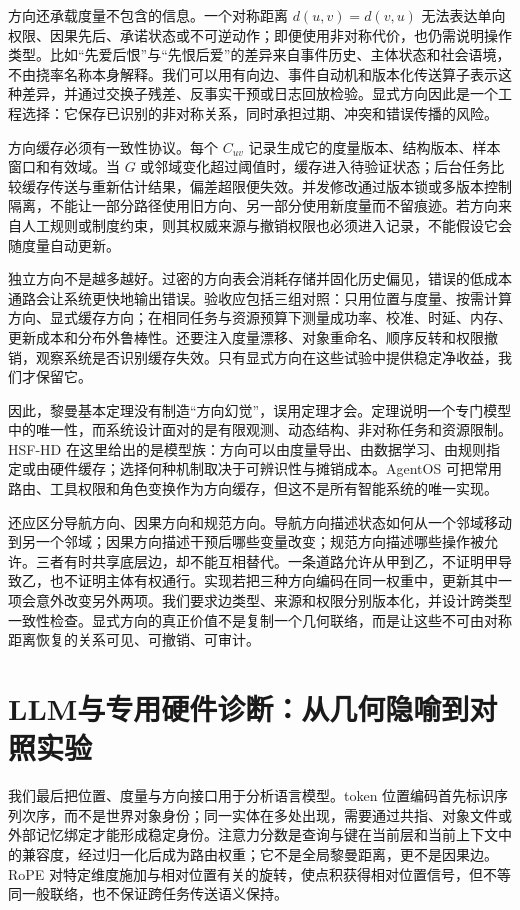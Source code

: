 方向还承载度量不包含的信息。一个对称距离 $d(u,v)=d(v,u)$ 无法表达单向权限、因果先后、承诺状态或不可逆动作；即便使用非对称代价，也仍需说明操作类型。比如“先爱后恨”与“先恨后爱”的差异来自事件历史、主体状态和社会语境，不由挠率名称本身解释。我们可以用有向边、事件自动机和版本化传送算子表示这种差异，并通过交换子残差、反事实干预或日志回放检验。显式方向因此是一个工程选择：它保存已识别的非对称关系，同时承担过期、冲突和错误传播的风险。

方向缓存必须有一致性协议。每个 $C_{uv}$ 记录生成它的度量版本、结构版本、样本窗口和有效域。当 $G$ 或邻域变化超过阈值时，缓存进入待验证状态；后台任务比较缓存传送与重新估计结果，偏差超限便失效。并发修改通过版本锁或多版本控制隔离，不能让一部分路径使用旧方向、另一部分使用新度量而不留痕迹。若方向来自人工规则或制度约束，则其权威来源与撤销权限也必须进入记录，不能假设它会随度量自动更新。

独立方向不是越多越好。过密的方向表会消耗存储并固化历史偏见，错误的低成本通路会让系统更快地输出错误。验收应包括三组对照：只用位置与度量、按需计算方向、显式缓存方向；在相同任务与资源预算下测量成功率、校准、时延、内存、更新成本和分布外鲁棒性。还要注入度量漂移、对象重命名、顺序反转和权限撤销，观察系统是否识别缓存失效。只有显式方向在这些试验中提供稳定净收益，我们才保留它。

因此，黎曼基本定理没有制造“方向幻觉”，误用定理才会。定理说明一个专门模型中的唯一性，而系统设计面对的是有限观测、动态结构、非对称任务和资源限制。HSF-HD 在这里给出的是模型族：方向可以由度量导出、由数据学习、由规则指定或由硬件缓存；选择何种机制取决于可辨识性与摊销成本。AgentOS 可把常用路由、工具权限和角色变换作为方向缓存，但这不是所有智能系统的唯一实现。

还应区分导航方向、因果方向和规范方向。导航方向描述状态如何从一个邻域移动到另一个邻域；因果方向描述干预后哪些变量改变；规范方向描述哪些操作被允许。三者有时共享底层边，却不能互相替代。一条道路允许从甲到乙，不证明甲导致乙，也不证明主体有权通行。实现若把三种方向编码在同一权重中，更新其中一项会意外改变另外两项。我们要求边类型、来源和权限分别版本化，并设计跨类型一致性检查。显式方向的真正价值不是复制一个几何联络，而是让这些不可由对称距离恢复的关系可见、可撤销、可审计。

\section{LLM与专用硬件诊断：从几何隐喻到对照实验}
\label{sec:llm_geometric_disability_tpu_g}

我们最后把位置、度量与方向接口用于分析语言模型。token 位置编码首先标识序列次序，而不是世界对象身份；同一实体在多处出现，需要通过共指、对象文件或外部记忆绑定才能形成稳定身份。注意力分数是查询与键在当前层和当前上下文中的兼容度，经过归一化后成为路由权重；它不是全局黎曼距离，更不是因果边。RoPE 对特定维度施加与相对位置有关的旋转，使点积获得相对位置信号，但不等同一般联络，也不保证跨任务传送语义保持。

